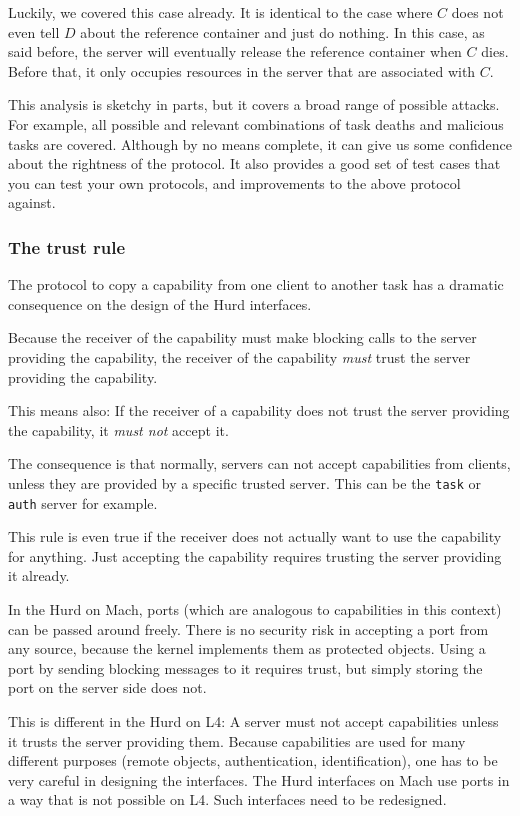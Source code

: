 \documentclass[9pt,a4paper]{extarticle}
\begin{document}
Luckily, we covered this case already.  It is identical to the case
where $C$ does not even tell $D$ about the reference container and
just do nothing.  In this case, as said before, the server will
eventually release the reference container when $C$ dies.  Before
that, it only occupies resources in the server that are associated
with $C$.

This analysis is sketchy in parts, but it covers a broad range of
possible attacks.  For example, all possible and relevant combinations
of task deaths and malicious tasks are covered.  Although by no means
complete, it can give us some confidence about the rightness of the
protocol.  It also provides a good set of test cases that you can test
your own protocols, and improvements to the above protocol against.


\subsubsection{The trust rule}

The protocol to copy a capability from one client to another task has
a dramatic consequence on the design of the Hurd interfaces.

Because the receiver of the capability must make blocking calls to the
server providing the capability, the receiver of the capability
\emph{must} trust the server providing the capability.

This means also: If the receiver of a capability does not trust the
server providing the capability, it \emph{must not} accept it.

The consequence is that normally, servers can not accept capabilities
from clients, unless they are provided by a specific trusted server.
This can be the \texttt{task} or \texttt{auth} server for example.

This rule is even true if the receiver does not actually want to use
the capability for anything.  Just accepting the capability requires
trusting the server providing it already.

In the Hurd on Mach, ports (which are analogous to capabilities in
this context) can be passed around freely.  There is no security risk
in accepting a port from any source, because the kernel implements
them as protected objects.  Using a port by sending blocking messages
to it requires trust, but simply storing the port on the server side
does not.

This is different in the Hurd on L4: A server must not accept
capabilities unless it trusts the server providing them.  Because
capabilities are used for many different purposes (remote objects,
authentication, identification), one has to be very careful in
designing the interfaces.  The Hurd interfaces on Mach use ports in a
way that is not possible on L4.  Such interfaces need to be
redesigned.
\end{document}
